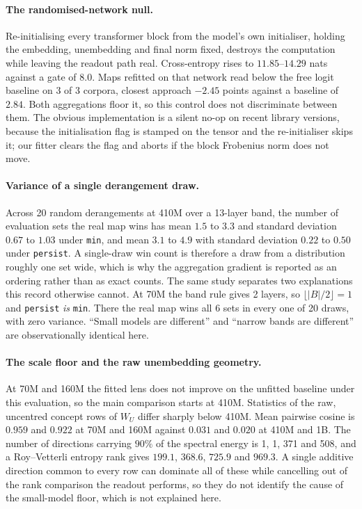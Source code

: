 \documentclass{article}
\newcommand{\mn}{\texttt{min}}
\newcommand{\pe}{\texttt{persist}}
\begin{document}
\paragraph{The randomised-network null.} Re-initialising every transformer block from the model's
own initialiser, holding the embedding, unembedding and final norm fixed, destroys the computation
while leaving the readout path real. Cross-entropy rises to $11.85$--$14.29$ nats against a
gate of $8.0$. Maps refitted on that network read below the free logit baseline on 3 of 3 corpora, closest
approach $-2.45$ points against a baseline of $2.84$. Both aggregations floor it,
so this control does not discriminate between them. The obvious implementation is a silent no-op on
recent library versions, because the initialisation flag is stamped on the tensor and the
re-initialiser skips it; our fitter clears the flag and aborts if the block Frobenius norm does not
move.

\paragraph{Variance of a single derangement draw.} Across 20 random derangements at 410M over
a 13-layer band, the number of evaluation sets the real map wins has mean $1.5$ to $3.3$ and
standard deviation $0.67$ to $1.03$ under \mn, and mean $3.1$ to $4.9$ with standard deviation
$0.22$ to $0.50$ under \pe. A single-draw win count is therefore a draw from a distribution roughly
one set wide, which is why the aggregation gradient is reported as an ordering rather than as exact
counts. The same study separates two explanations this record otherwise cannot. At 70M the band rule gives
2 layers, so $\lfloor|B|/2\rfloor=1$ and \pe{} \emph{is} \mn. There the real map wins all 6
sets in every one of 20 draws, with zero variance. ``Small models are different'' and ``narrow
bands are different'' are observationally identical here.

\paragraph{The scale floor and the raw unembedding geometry.} At 70M and 160M the fitted lens
does not improve on the unfitted baseline under this evaluation, so the main comparison starts at
410M. Statistics of the raw, uncentred concept rows of $W_U$ differ sharply below 410M. Mean pairwise
cosine is $0.959$ and $0.922$ at 70M and 160M against $0.031$ and $0.020$ at 410M and 1B. The
number of directions carrying $90\%$ of the spectral energy is 1, 1, 371 and 508, and a
Roy--Vetterli entropy rank gives $199.1$, $368.6$, $725.9$ and $969.3$. A single additive direction
common to every row can dominate all of these while cancelling out of the rank comparison the
readout performs, so they do not identify the cause of the small-model floor, which is not
explained here.
\end{document}
